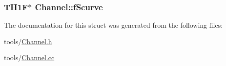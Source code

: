 \hypertarget{struct_channel_acc4d3eaf08d6c4951f3ae678000ff684}{
\subsubsection[{f\-Scurve}]{\setlength{\rightskip}{0pt plus 5cm}T\-H1\-F$\ast$ Channel\-::f\-Scurve}}\label{struct_channel_acc4d3eaf08d6c4951f3ae678000ff684}


The documentation for this struct was generated from the following files\-:\begin{DoxyCompactItemize}
\item 
tools/\hyperlink{_channel_8h}{Channel.\-h}\item 
tools/\hyperlink{_channel_8cc}{Channel.\-cc}\end{DoxyCompactItemize}
